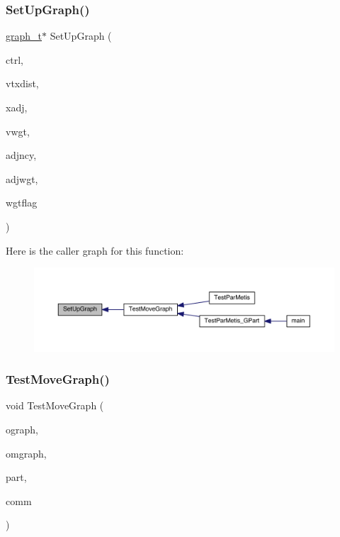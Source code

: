 \subsubsection{\texorpdfstring{Set\+Up\+Graph()}{SetUpGraph()}}
{\footnotesize\ttfamily \hyperlink{a00734}{graph\+\_\+t}$\ast$ Set\+Up\+Graph (\begin{DoxyParamCaption}\item[{\hyperlink{a00742}{ctrl\+\_\+t} $\ast$}]{ctrl,  }\item[{\hyperlink{a00876_aaa5262be3e700770163401acb0150f52}{idx\+\_\+t} $\ast$}]{vtxdist,  }\item[{\hyperlink{a00876_aaa5262be3e700770163401acb0150f52}{idx\+\_\+t} $\ast$}]{xadj,  }\item[{\hyperlink{a00876_aaa5262be3e700770163401acb0150f52}{idx\+\_\+t} $\ast$}]{vwgt,  }\item[{\hyperlink{a00876_aaa5262be3e700770163401acb0150f52}{idx\+\_\+t} $\ast$}]{adjncy,  }\item[{\hyperlink{a00876_aaa5262be3e700770163401acb0150f52}{idx\+\_\+t} $\ast$}]{adjwgt,  }\item[{\hyperlink{a00876_aaa5262be3e700770163401acb0150f52}{idx\+\_\+t}}]{wgtflag }\end{DoxyParamCaption})}

Here is the caller graph for this function\+:\nopagebreak
\begin{figure}[H]
\begin{center}
\leavevmode
\includegraphics[width=350pt]{a00428_ac5472d28ea064341acff9be6744eea92_icgraph}
\end{center}
\end{figure}
\mbox{\label{a00428_a136ad3b21ef4f877c3100a997814e8ce}} 
\subsubsection{\texorpdfstring{Test\+Move\+Graph()}{TestMoveGraph()}}
{\footnotesize\ttfamily void Test\+Move\+Graph (\begin{DoxyParamCaption}\item[{\hyperlink{a00734}{graph\+\_\+t} $\ast$}]{ograph,  }\item[{\hyperlink{a00734}{graph\+\_\+t} $\ast$}]{omgraph,  }\item[{\hyperlink{a00876_aaa5262be3e700770163401acb0150f52}{idx\+\_\+t} $\ast$}]{part,  }\item[{M\+P\+I\+\_\+\+Comm}]{comm }\end{DoxyParamCaption})}

